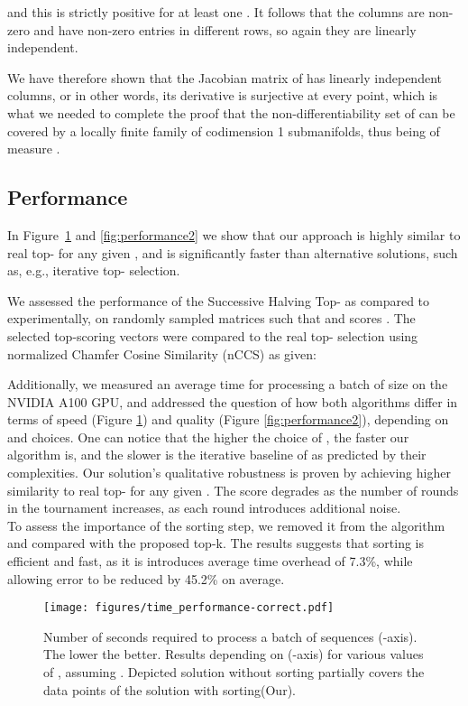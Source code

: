 \documentclass{article}
\begin{document}
and this is strictly positive for at least one . It follows that the columns are non-zero and have non-zero entries in different rows, so again they are linearly independent.

We have therefore shown that the Jacobian matrix of  has linearly independent columns, or in other words, its derivative is surjective at every point, which is what we needed to complete the proof that the non-differentiability set of  can be covered by a locally finite family of codimension 1 submanifolds, thus being of measure .


\subsection{Performance}\label{topk_performance}
In Figure~\ref{fig:performance} and \ref{fig:performance2} we show that our approach is highly similar to real top- for any given , and is significantly faster than alternative solutions, such as, e.g., iterative top- selection.

We assessed the performance of the Successive Halving Top- as compared to \citet{goyal2017continuous} experimentally, on randomly sampled matrices  such that  and scores . The selected  top-scoring vectors were compared to the real top- selection using normalized Chamfer Cosine Similarity (nCCS) as given:


Additionally, we measured an average time for processing a batch of size  on the NVIDIA A100 GPU,
and addressed the question of how both algorithms differ in terms of speed (Figure \ref{fig:performance}) and quality (Figure \ref{fig:performance2}), depending on  and  choices.
One can notice that the higher the choice of , the faster our algorithm is, and the slower is the iterative baseline of \citet{goyal2017continuous} as predicted by their complexities. Our solution's qualitative robustness is proven by achieving higher similarity to real top- for any given . The score degrades as the number of rounds in the tournament increases, as each round introduces additional noise.\\
To assess the importance of the sorting step, we removed it from the algorithm and compared with the proposed top-k. The results suggests that sorting is efficient and fast, as it is introduces average time overhead of 7.3\%, while allowing error to be reduced by 45.2\% on average.

\begin{figure}
    \centering
    \texttt{[image: figures/time\_performance-correct.pdf]}
    \caption{Number of seconds required to process a batch of sequences (-axis). The lower the better. Results depending on  (-axis) for various values of , assuming . Depicted solution without sorting partially covers the data points of the solution with sorting(Our).}
    \label{fig:performance}
\end{figure}
\end{document}
